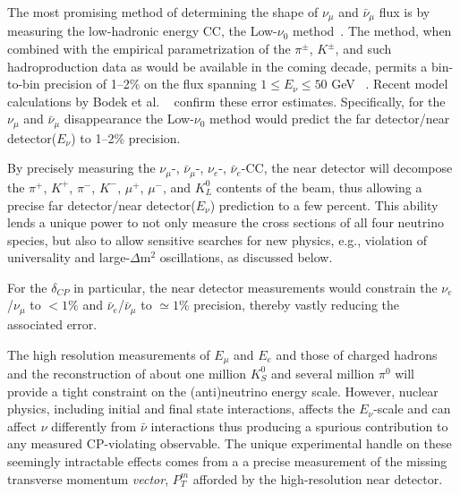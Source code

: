 The most promising method of determining 
the shape of  $\nu_\mu$ and $\bar \nu_\mu$ flux is by measuring the low-hadronic energy CC, the Low-$\nu_0$
method~\cite{MISHRA-Nu0}. The method, when combined with the empirical 
parametrization of the $\pi^{\pm}$, $K^{\pm}$,  
and such hadroproduction data as would be available in the coming decade, permits a bin-to-bin precision of 1--2\% on 
the flux spanning $1 \leq E_\nu \leq 50$ GeV ~\cite{near-detector-REL-FLUX}. 
Recent model calculations by Bodek et al. ~\cite{Bodek:2012uu} confirm these error estimates. 
Specifically, for the $\nu_\mu$ and $\bar \nu_\mu$ disappearance the Low-$\nu_0$ method would predict the 
far detector/near detector($E_\nu$) to 1--2\% precision. 

By precisely measuring the $\nu_\mu$-, $\bar \nu_\mu$-, $\nu_e$-, $\bar \nu_e$-CC, 
the near detector will decompose the $\pi^+$, $K^+$, $\pi^-$, $K^-$, $\mu^+$, $\mu^-$, and $K^0_L$ contents of the beam, thus 
allowing a precise far detector/near detector($E_\nu$) prediction to a few percent.  This ability lends a unique power to 
not only measure the cross sections of all four neutrino species, but also to allow sensitive searches for new 
physics, e.g., violation of universality and large-$\Delta$m$^2$ oscillations, as discussed %
below. 

\noindent
For the $\delta_{CP}$ in particular, the near detector measurements would constrain the $\nu_e$/$\nu_\mu$ to 
$<1\%$ and $\bar \nu_e$/$\bar \nu_\mu$ to $\simeq 1\%$ precision, thereby vastly reducing the associated error. 



The high resolution 
measurements of $E_\mu$ and $E_e$ and those of charged hadrons and the reconstruction of about one 
million $K^0_S$ and several million $\pi^0$ will provide a tight constraint on the (anti)neutrino energy scale. 
However, nuclear physics, including initial and final state interactions, 
 affects the $E_\nu$-scale and can affect $\nu$ differently from $\bar\nu$ interactions thus  
producing a spurious contribution to any measured CP-violating observable. 
The unique experimental handle on these seemingly intractable effects comes from a 
a precise measurement of the missing transverse momentum {\it vector},{ \bf{ $P^m_T$}} afforded by the 
high-resolution near detector. 


